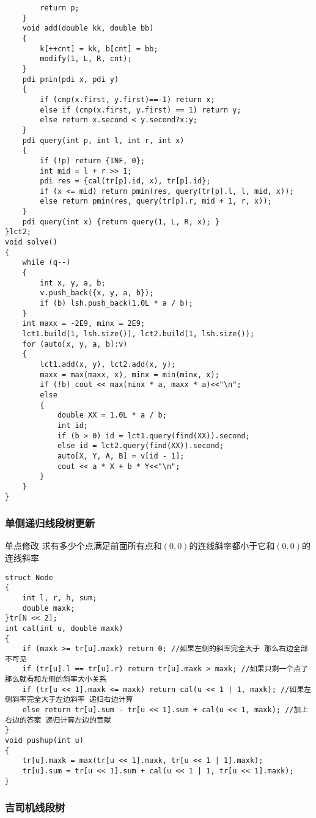 \documentclass[a4paper,fontset=none]{ctexart}
\begin{document}
\begin{verbatim}
        return p;
    }
    void add(double kk, double bb)
    {
        k[++cnt] = kk, b[cnt] = bb;
        modify(1, L, R, cnt);
    }
    pdi pmin(pdi x, pdi y)
    {
        if (cmp(x.first, y.first)==-1) return x;
        else if (cmp(x.first, y.first) == 1) return y;
        else return x.second < y.second?x:y;
    }
    pdi query(int p, int l, int r, int x)
    {
        if (!p) return {INF, 0};
        int mid = l + r >> 1;
        pdi res = {cal(tr[p].id, x), tr[p].id};
        if (x <= mid) return pmin(res, query(tr[p].l, l, mid, x));
        else return pmin(res, query(tr[p].r, mid + 1, r, x));
    }
    pdi query(int x) {return query(1, L, R, x); }
}lct2;
void solve()
{
    while (q--)
    {
        int x, y, a, b;
        v.push_back({x, y, a, b});
        if (b) lsh.push_back(1.0L * a / b);
    }
    int maxx = -2E9, minx = 2E9;
    lct1.build(1, lsh.size()), lct2.build(1, lsh.size());
    for (auto[x, y, a, b]:v)
    {
        lct1.add(x, y), lct2.add(x, y);
        maxx = max(maxx, x), minx = min(minx, x);
        if (!b) cout << max(minx * a, maxx * a)<<"\n";
        else
        {
            double XX = 1.0L * a / b;
            int id;
            if (b > 0) id = lct1.query(find(XX)).second;
            else id = lct2.query(find(XX)).second;
            auto[X, Y, A, B] = v[id - 1];
            cout << a * X + b * Y<<"\n";
        }
    }
}
\end{verbatim}
\subsubsection{单侧递归线段树更新}
单点修改 \quad 求有多少个点满足前面所有点和$(0,0)$的连线斜率都小于它和$(0,0)$的连线斜率

\begin{verbatim}
struct Node
{
    int l, r, h, sum;
    double maxk;
}tr[N << 2];
int cal(int u, double maxk)
{
    if (maxk >= tr[u].maxk) return 0; //如果左侧的斜率完全大于 那么右边全部不可见
    if (tr[u].l == tr[u].r) return tr[u].maxk > maxk; //如果只剩一个点了 那么就看和左侧的斜率大小关系
    if (tr[u << 1].maxk <= maxk) return cal(u << 1 | 1, maxk); //如果左侧斜率完全大于左边斜率 递归右边计算
    else return tr[u].sum - tr[u << 1].sum + cal(u << 1, maxk); //加上右边的答案 递归计算左边的贡献
}
void pushup(int u)
{
    tr[u].maxk = max(tr[u << 1].maxk, tr[u << 1 | 1].maxk);
    tr[u].sum = tr[u << 1].sum + cal(u << 1 | 1, tr[u << 1].maxk);
}
\end{verbatim}
\subsubsection{吉司机线段树}
\end{document}
